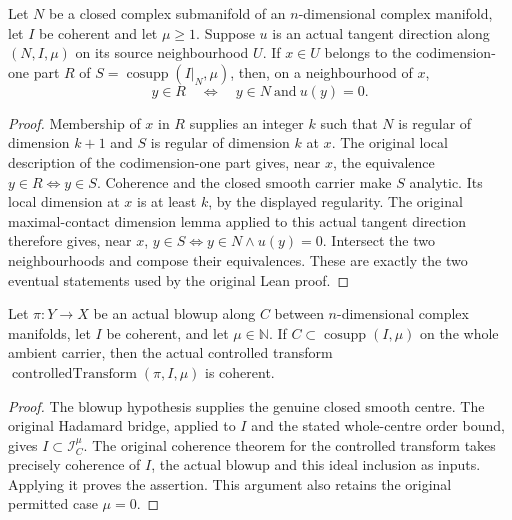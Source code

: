 \begin{lemma}
\label{pub:codim-one-contact-local-equation}
\notready
Let $N$ be a closed complex submanifold of an $n$-dimensional complex manifold,
let $I$ be coherent and let $\mu\ge1$. Suppose $u$ is an actual tangent direction
along $(N,I,\mu)$ on its source neighbourhood $U$. If $x\in U$ belongs to the
codimension-one part $R$ of $S=\operatorname{cosupp}(I|_N,\mu)$, then, on a
neighbourhood of $x$,
\[
       y\in R\quad\Longleftrightarrow\quad y\in N\ \text{and}\ u(y)=0.
\]
\end{lemma}
\begin{proof}
Membership of $x$ in $R$ supplies an integer $k$ such that $N$ is regular of
dimension $k+1$ and $S$ is regular of dimension $k$ at $x$. The original local
description of the codimension-one part gives, near $x$, the equivalence
$y\in R\Longleftrightarrow y\in S$.
Coherence and the closed smooth carrier make $S$ analytic. Its local dimension
at $x$ is at least $k$, by the displayed regularity. The original
maximal-contact dimension lemma applied to this actual tangent direction
therefore gives, near $x$, $y\in S\Longleftrightarrow y\in N\land u(y)=0$.
Intersect the two neighbourhoods and compose their equivalences. These are
exactly the two eventual statements used by the original Lean proof.
\end{proof}

\begin{lemma}
\label{pub:hadamard-controlled-transform-coherent}
\notready
Let $\pi:Y\to X$ be an actual blowup along $C$ between $n$-dimensional complex
manifolds, let $I$ be coherent, and let $\mu\in\mathbb N$. If
$C\subset\operatorname{cosupp}(I,\mu)$ on the whole ambient carrier, then the
actual controlled transform $\operatorname{controlledTransform}(\pi,I,\mu)$
is coherent.
\end{lemma}
\begin{proof}
The blowup hypothesis supplies the genuine closed smooth centre. The original
Hadamard bridge, applied to $I$ and the stated whole-centre order bound, gives
$I\subset\mathcal I_C^\mu$. The original coherence theorem for the controlled
transform takes precisely coherence of $I$, the actual blowup and this ideal
inclusion as inputs. Applying it proves the assertion. This argument also
retains the original permitted case $\mu=0$.
\end{proof}
